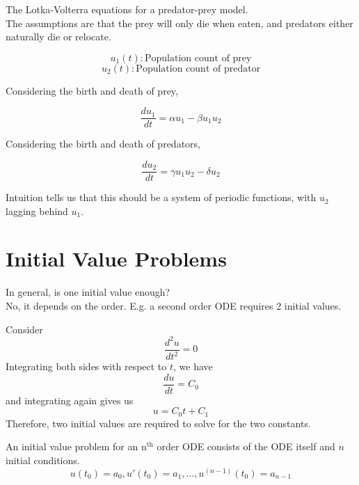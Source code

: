 \documentclass[12pt]{article}
\begin{document}
\begin{ex}
The Lotka-Volterra equations for a predator-prey model. \\
The assumptions are that the prey will only die when eaten, and predators either naturally die or relocate.

$$u_1(t): \text{Population count of prey}$$
$$u_2(t): \text{Population count of predator}$$

Considering the birth and death of prey,

$$\frac{du_1}{dt} = \alpha u_1 - \beta u_1u_2$$

Considering the birth and death of predators,

$$\frac{du_2}{dt} = \gamma u_1u_2 - \delta u_2$$

Intuition tells us that this should be a system of periodic functions, with $u_2$ lagging behind $u_1$.
\end{ex}

\section{Initial Value Problems}

In general, is one initial value enough? \\
No, it depends on the order. E.g. a second order ODE requires 2 initial values.

\begin{ex}
Consider $$\frac{d^2u}{dt^2} = 0$$
Integrating both sides with respect to $t$, we have
$$\frac{du}{dt} = C_0$$
and integrating again gives us
$$u = C_0t + C_1$$
Therefore, two initial values are required to solve for the two constants.
\end{ex}

\begin{defn}
An initial value problem for an n$^{\text{th}}$ order ODE consists of the ODE itself and $n$ initial conditions.
$$u(t_0) = a_0, u'(t_0) = a_1, \dots, u^{(n-1)}(t_0) = a_{n-1}$$
\end{defn}
\end{document}
